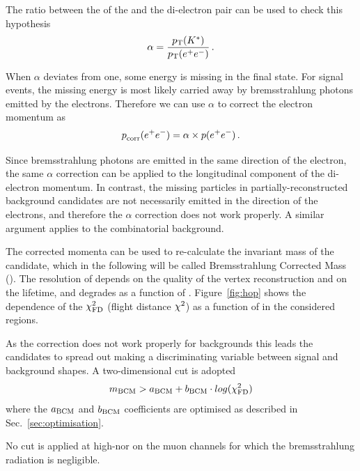 The ratio between the \pt of the \Kstarz and the di-electron pair can be used to check this hypothesis
%
$$\alpha = \frac{\mbox{$p_{\rm T}$}({{K}^*})}{\mbox{$p_{\rm T}$}(e^+ e^-)} \, .$$

When $\alpha$ deviates from one, some energy is missing in the final state. 
For signal events, the missing energy is most likely carried away by bremsstrahlung photons emitted
by the electrons. Therefore we can use $\alpha$ to correct the electron momentum as
%
$$\mbox{$p$}_{\textrm{corr}}(e^+ e^-) = \alpha \times \mbox{$p$}(e^+ e^-) \, .$$

Since bremsstrahlung photons are emitted in the same direction of the electron, the same $\alpha$ correction can
be applied to the longitudinal component of the di-electron momentum.
In contrast, the missing particles in partially-reconstructed background candidates are not necessarily emitted in the
direction of the electrons, and therefore the $\alpha$ correction does not work properly.
A similar argument applies to the combinatorial background. 

The corrected momenta can be used to re-calculate the invariant mass of the \Bz candidate, which in the following will be
called Bremsstrahlung Corrected Mass (\mbcm). The resolution of \mbcm depends on the quality of the vertex reconstruction
and on the \Bz lifetime, and degrades as a function of \qsq. Figure~\ref{fig:hop} shows the dependence of the \Bz $\chi^2_{\rm FD}$ 
(flight distance $\chi^2$) as a function of \mbcm in the considered \qsq regions. 

As the correction does not work properly for backgrounds this leads the candidates to spread out making \mbcm 
a discriminating variable between signal and background shapes. A two-dimensional cut is adopted
%
$$m_{\rm BCM} > a_{\rm BCM} + b_{\rm BCM} \cdot log(\chi^2_{\rm FD})$$
%
where the $a_{\rm BCM}$ and $b_{\rm BCM}$ coefficients are optimised as described in Sec.~\ref{sec:optimisation}.

No cut is applied at high-\qsq nor on the muon channels for which the bremsstrahlung radiation is negligible.




